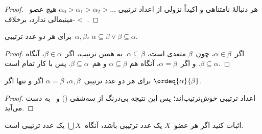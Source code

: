 \documentclass[../../../include/open-logic-section]{subfiles}
\begin{document}
\begin{proof}
هر دنبالهٔ نامتناهی و اکیداً نزولی از اعداد ترتیبی
$\alpha_0>\alpha_1>\alpha_2>\ldots$ هیچ عضو~$<$-مینیمالی ندارد، برخلاف
.
\end{proof}

\begin{prop}
برای هر دو عدد ترتیبی~$\alpha,\beta$،
$\alpha \subseteq \beta \lor \beta \subseteq \alpha$.
\end{prop}

\begin{proof}
اگر~$\alpha \in \beta$، چون~$\beta$ متعدی است،
$\alpha \subseteq \beta$. به همین ترتیب، اگر~$\beta \in \alpha$، آنگاه
$\beta \subseteq \alpha$. و اگر~$\alpha=\beta$، آنگاه هم
$\alpha \subseteq \beta$ و هم~$\beta \subseteq \alpha$. پس با
 کار تمام است.
\end{proof}

\begin{prop}
برای هر دو عدد ترتیبی~$\alpha,\beta$، $\alpha=\beta$ اگر و تنها اگر
$\ordeq{\alpha}{\beta}$.
\end{prop}

\begin{proof}
اعداد ترتیبی خوش‌ترتیب‌اند؛ پس این نتیجه بی‌درنگ از سه‌شقی
() و~ به دست
می‌آید.
\end{proof}

\begin{prob}
اثبات کنید اگر هر عضو~$X$ یک عدد ترتیبی باشد، آنگاه~$\bigcup X$ یک عدد
ترتیبی است.
\end{prob}
\end{document}
